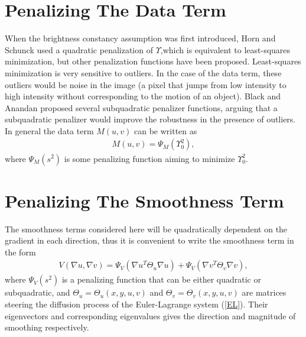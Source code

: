 \section{Penalizing The Data Term}
\label{sec:Data_penalization}
When the brightness constancy assumption was first introduced, Horn and Schunck used a quadratic penalization of $\Upsilon$,which is equivalent to least-squares minimization, but other penalization functions have been proposed. Least-squares minimization is very sensitive to outliers. In the case of the data term, these outliers would be noise in the image (a pixel that jumps from low intensity to high intensity without corresponding to the motion of an object). Black and Anandan \cite{Black199675} proposed several subquadratic penalizer functions, arguing that a subquadratic penalizer would improve the robustness in the presence of outliers. In general the data term $M(u,v)$ can be written as
\begin{align}
\label{DataPenalize}
M(u,v) = \Psi_M(\Upsilon_0^2),
\end{align}
where $\Psi_M(s^2)$ is some penalizing function aiming to minimize $\Upsilon_0^2$. 

\section{Penalizing The Smoothness Term}
The smoothness terms considered here will be quadratically dependent on the gradient in each direction, thus it is convenient to write the smoothness term in the form
\begin{align}
\label{SmoothnessTerm}
V(\nabla u, \nabla v) = \Psi_V(\nabla u ^T \Theta_u \nabla u) + \Psi_V(\nabla v ^T \Theta_v \nabla v),
\end{align}
where $\Psi_V(s^2)$ is a penalizing function that can be either quadratic or subquadratic, and $\Theta_u = \Theta_u(x,y,u,v)$ and $\Theta_v = \Theta_v(x,y,u,v)$ are matrices steering the diffusion process of the Euler-Lagrange system (\ref{EL}). Their eigenvectors and corresponding eigenvalues gives the direction and magnitude of smoothing respectively.

